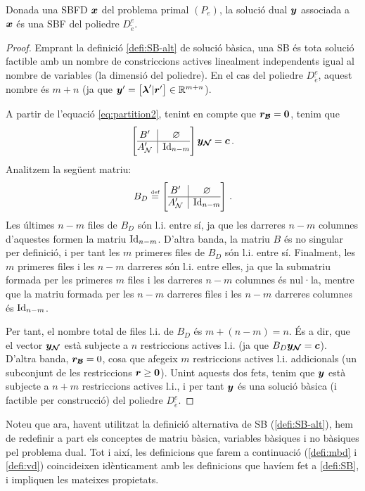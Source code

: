 \begin{prop}\label{prop:SD-SDBF}
	Donada una SBFD $\boldsymbol{x}$ del problema primal $(P_e)$, la solució dual $\boldsymbol{y}$ associada a $\boldsymbol{x}$ és una SBF del poliedre $D^e_{\tilde{e}}$.
	\begin{proof}
		Emprant la definició \ref{defi:SB-alt} de solució bàsica, una SB és tota solució factible amb un nombre de constriccions actives linealment independents igual al nombre de variables (la dimensió del poliedre). En el cas del poliedre $D^e_{\tilde{e}}$, aquest nombre és $m+n$ (ja que $\boldsymbol{y}' = \left[\boldsymbol{\lambda}'\vert \boldsymbol{r}'\right]\in \mathbb{R}^{m+n}$).
		
		A partir de l'equació \eqref{eq:partition2}, tenint en compte que $\boldsymbol{r_{\mathcal{B}}}=\boldsymbol{0}$, tenim que
		\[
			\left[\begin{array}{{@{}c|c@{}}}
			B'	  &	\varnothing	\\
			\hline
			A_\N' & \Id_{n-m}
			\end{array}\right]
			\vb{y_\N} = \vb{c}\,.
		\]
		Analitzem la següent matriu:
		\[
			B_D \defeq \left[
			\begin{array}{@{}c|c@{}}
				B'	  &	\varnothing	\\
				\hline
				A_\N' & \Id_{n-m}
			\end{array}
			\right]\,.
		\]
		Les últimes $n-m$ files de $B_D$ són l.i. entre sí, ja que les darreres $n-m$ columnes d'aquestes formen la matriu $\operatorname{Id}_{n-m}$. D'altra banda, la matriu $B$ és no singular per definició, i per tant les $m$ primeres files de $B_D$ són l.i. entre sí. Finalment, les $m$ primeres files i les $n-m$ darreres són l.i. entre elles, ja que la submatriu formada per les primeres $m$ files i les darreres $n-m$ columnes és nul·la, mentre que la matriu formada per les $n-m$ darreres files i les $n-m$ darreres columnes és $\operatorname{Id}_{n-m}$.
		
		Per tant, el nombre total de files l.i. de $B_D$ és $m+(n-m) = n$. És a dir, que el vector $\boldsymbol{y_{\mathcal{N}}}$ està subjecte a $n$ restriccions actives l.i. (ja que $B_D \boldsymbol{y_{\mathcal{N}}} = \boldsymbol{c}$). D'altra banda, $\boldsymbol{r_{\mathcal{B}}} = 0$, cosa que afegeix $m$ restriccions actives l.i. addicionals (un subconjunt de les restriccions $\boldsymbol{r}\ge\boldsymbol{0}$). Unint aquests dos fets, tenim que $\boldsymbol{y}$ està subjecte a $n+m$ restriccions actives l.i., i per tant $\boldsymbol{y}$ és una solució bàsica (i factible per construcció) del poliedre $D^e_{\tilde{e}}$.
	\end{proof}
\end{prop}

Noteu que ara, havent utilitzat la definició alternativa de SB (\ref{defi:SB-alt}), hem de redefinir a part els conceptes de matriu bàsica, variables bàsiques i no bàsiques pel problema dual. Tot i així, les definicions que farem a continuació (\ref{defi:mbd} i \ref{defi:vd}) coincideixen idènticament amb les definicions que havíem fet a \ref{defi:SB}, i impliquen les mateixes propietats.

